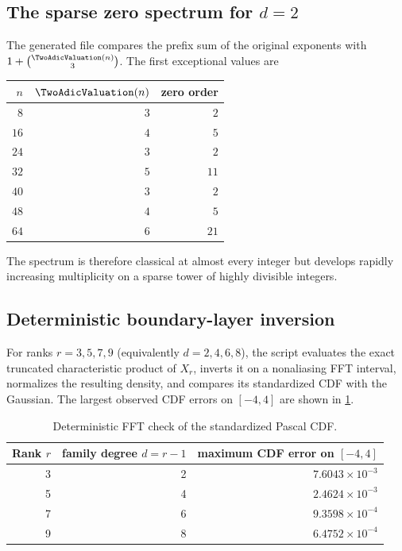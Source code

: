 \documentclass[11pt,oneside]{article}
\numberwithin{equation}{section}
\theoremstyle{definition}
\theoremstyle{remark}
\begin{document}
\subsection{The sparse zero spectrum for $d=2$}

The generated file  compares the prefix sum of the original
exponents with $1+\binom{\TwoAdicValuation(n)}3$.  The first exceptional values are
\begin{center}
\begin{tabular}{@{}r r r@{}}
\toprule
$n$ & $\TwoAdicValuation(n)$ & zero order\\
\midrule
$8$ & $3$ & $2$\\
$16$ & $4$ & $5$\\
$24$ & $3$ & $2$\\
$32$ & $5$ & $11$\\
$40$ & $3$ & $2$\\
$48$ & $4$ & $5$\\
$64$ & $6$ & $21$\\
\bottomrule
\end{tabular}
\end{center}
The spectrum is therefore classical at almost every integer but develops rapidly increasing
multiplicity on a sparse tower of highly divisible integers.

\subsection{Deterministic boundary-layer inversion}

For ranks $r=3,5,7,9$ (equivalently $d=2,4,6,8$), the script evaluates the exact truncated
characteristic product of $X_r$, inverts it on a nonaliasing FFT interval, normalizes the
resulting density, and compares its standardized CDF with the Gaussian.  The largest observed
CDF errors on $[-4,4]$ are shown in \cref{p1:tab:boundary-errors}.

\begin{table}[htbp]
\centering
\small
\caption{Deterministic FFT check of the standardized Pascal CDF.}
\label{p1:tab:boundary-errors}
\begin{tabular}{@{}r r r@{}}
\toprule
Rank $r$ & family degree $d=r-1$ & maximum CDF error on $[-4,4]$\\
\midrule
3 & 2 & $7.6043\times10^{-3}$\\
5 & 4 & $2.4624\times10^{-3}$\\
7 & 6 & $9.3598\times10^{-4}$\\
9 & 8 & $6.4752\times10^{-4}$\\
\bottomrule
\end{tabular}
\end{table}
\end{document}
